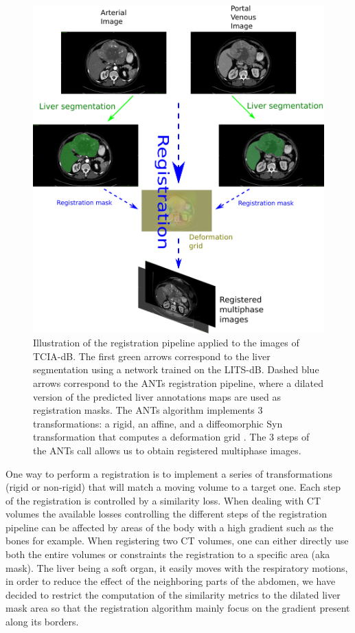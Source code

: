 \documentclass[]{article}
\newcommand{\lmttfont}[1]{{\fontfamily{lmtt}\selectfont #1}}
\begin{document}
\begin{figure}[th!]
\centering
\includegraphics[width=0.7\linewidth]{images/RegistrationTCIA_pipeline_vertical2}
\caption{Illustration of the registration pipeline applied to the images of \lmttfont{TCIA-dB}. The first green arrows correspond to the liver segmentation using a network trained on the \lmttfont{LITS-dB}. Dashed blue arrows correspond to the ANTs registration pipeline, where a dilated version of the predicted liver annotations maps are used as registration masks. The ANTs algorithm implements 3 transformations: a rigid, an affine, and a diffeomorphic Syn transformation that computes a deformation grid \cite{Avants2008}. The 3 steps of the ANTs call allows us to obtain registered multiphase images.}
\label{fig:RegistrationTCIA_pipeline_vertical2}
\end{figure}




One way to perform a registration is to implement a series of
transformations (rigid or non-rigid) that will match a moving volume to
a target one. Each step of the registration is controlled by a
similarity loss.
When dealing with CT volumes the available losses controlling the
different steps of the registration pipeline can be affected by areas of
the body with a high gradient such as the bones for example. When
registering two CT volumes, one can either directly use both the entire
volumes or constraints the registration to a specific area (aka mask).
The liver being a soft organ, it easily moves with the respiratory
motions, in order to reduce the effect of the neighboring parts of the
abdomen, we have decided to restrict the computation of the similarity
metrics to the dilated liver mask area so that the registration
algorithm mainly focus on the gradient present along its borders.
\end{document}
